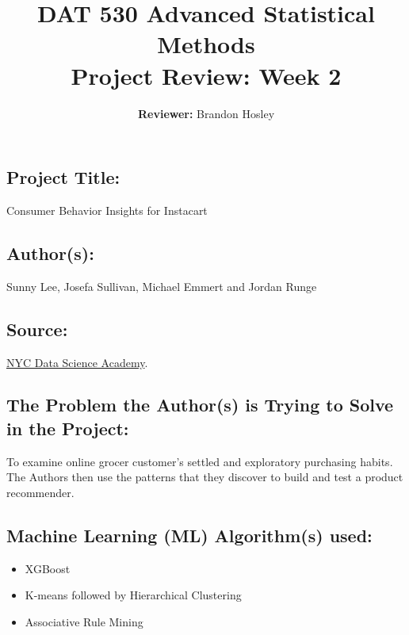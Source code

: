 \documentclass[]{article}
\title{\textbf{DAT 530 Advanced Statistical Methods}\\
	\normalsize{Project Review: Week 2} }
\author{\textbf{Reviewer: }
	Brandon Hosley}
\begin{document}
\setlength{\droptitle}{-10em} 
\pretitle{\begin{flushleft}\LARGE} %
	\posttitle{\end{flushleft}}
\preauthor{\begin{flushleft}\large} %
	\postauthor{\end{flushleft}}
\predate{\begin{flushleft}\large} %
	\postdate{\end{flushleft}}
\maketitle

\vspace{-2em}

\subsection*{Project Title:}
Consumer Behavior Insights for Instacart

\subsection*{Author(s):}
Sunny Lee, Josefa Sullivan, Michael Emmert and Jordan Runge

\subsection*{Source:}
\href{https://nycdatascience.com/blog/student-works/recommendations-for-online-groceries/}{NYC Data Science Academy}.

\subsection*{The Problem the Author(s) is Trying to Solve in the Project:}
To examine online grocer customer's settled and exploratory purchasing habits. \\
The Authors then use the patterns that they discover to build and test a product recommender.
 
\subsection*{Machine Learning (ML) Algorithm(s) used:}
\begin{itemize}
	\item XGBoost
	\item K-means followed by Hierarchical Clustering
	\item Associative Rule Mining
\end{itemize}
\end{document}

